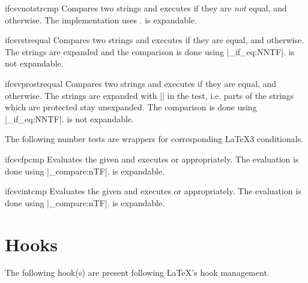 \documentclass[a4paper,11pt]{ltxdoc}
\begin{document}
\begin{docCommand}[doc new and updated={2016-07-01}{2021-06-28}]{ifcsvnotstrcmp}{}
  Compares two strings and executes  if they are \emph{not} equal, and  otherwise.
  The implementation uses .
   is expandable.
\end{docCommand}


\begin{docCommand}[doc new and updated={2016-07-01}{2021-06-28}]{ifcsvstrequal}{}
  Compares two strings and executes  if they are equal, and  otherwise.
  The strings are expanded
  and the comparison is done using |\tl_if_eq:NNTF|.
   is not expandable.
\end{docCommand}


\begin{docCommand}[doc new and updated={2016-07-01}{2021-06-28}]{ifcsvprostrequal}{}
  Compares two strings and executes  if they are equal, and  otherwise.
  The strings are expanded with |\protected@edef|
  in the test, i.e. parts of the
  strings which are protected stay unexpanded.
  The comparison is done using |\tl_if_eq:NNTF|.
   is not expandable.
\end{docCommand}


The following number tests are wrappers for corresponding \LaTeX3 conditionals.

\begin{docCommand}[doc new={2021-06-28}]{ifcsvfpcmp}{}
  Evaluates the given 
  and executes  or  appropriately.
  The evaluation is done using |\fp_compare:nTF|.
   is expandable.
\end{docCommand}

\begin{docCommand}[doc new={2021-06-28}]{ifcsvintcmp}{}
  Evaluates the given 
  and executes  or  appropriately.
  The evaluation is done using |\int_compare:nTF|.
   is expandable.
\end{docCommand}


\clearpage
\section{Hooks}\label{sec:hooks}%
The following hook(s) are present following \LaTeX's hook management.
\end{document}
